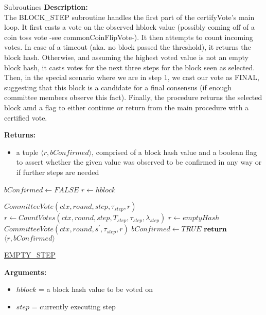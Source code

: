 \documentclass[10pt,a4paper]{article}
\begin{document}
\begin{section}{Subroutines}
\noindent \textbf{Description:}\\
The BLOCK\_STEP subroutine handles the first part of the certifyVote's main loop.
It first casts a vote on the observed hblock value (possibly coming off of a coin toss vote -see commonCoinFlipVote-).
It then attempts to count incoming votes. In case of a timeout (aka. no block passed the threshold), it returns the block hash.
Otherwise, and assuming the highest voted value is not an empty block hash, it casts votes for the next three steps for the block seen as selected.
Then, in the special scenario where we are in step 1, we cast our vote as FINAL, suggesting that this block is a candidate for a final consensus (if enough committee members observe this fact).
Finally, the procedure returns the selected block amd a flag to either continue or return from the main procedure with a certified vote.

\noindent \textbf{Returns:}
\begin{itemize}
    \item a tuple $\langle r, bConfirmed \rangle$, comprised of a block hash value and a boolean flag to assert whether the given value was
    observed to be confirmed in any way or if further steps are needed
  \end{itemize}

\begin{algorithm}[H]
    \begin{algorithmic}[H]
        \State $bConfirmed \gets FALSE$
        \State $r \gets hblock$

    \State $CommitteeVote(ctx, round, step, \tau_{step}, r)$
    \State $r \gets CountVotes(ctx,round,step,T_{step},\tau_{step},\lambda_{step})$
        \State $r \gets emptyHash$
            \State $CommitteeVote(ctx, round, s^\prime, \tau_{step}, r)$
        \EndFor
        \State $bConfirmed \gets TRUE$
    \EndIf
    $\Return$ $\langle r, bConfirmed \rangle$
    \EndFunction
    \end{algorithmic}
    \caption{\underline{EMPTY\_STEP}}
\end{algorithm}

\noindent \textbf{Arguments:}
\begin{itemize}
    \item $hblock$ = a block hash value to be voted on
    \item $step$ = currently executing step
  \end{itemize}


\end{section}
\end{document}
